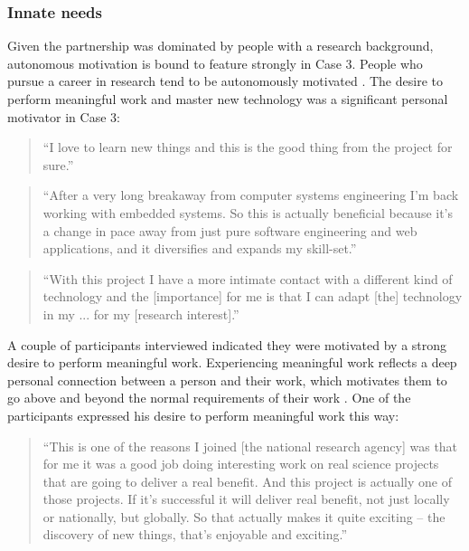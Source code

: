 \subsubsection{Innate needs}

Given the partnership was dominated by people with a research background, autonomous motivation is bound to feature strongly in Case 3. People who pursue a career in research tend to be autonomously motivated \citep{ryan2014work,suominen2021gold}. The desire to perform meaningful work and master new technology was a significant personal motivator in Case 3:

\begin{quote}
\small
\enquote{I love to learn new things and this is the good thing from the project for sure.} \\
\end{quote}

\begin{quote}
\small
\enquote{After a very long breakaway from computer systems engineering I'm back working with embedded systems. So this is actually beneficial because it's a change in pace away from just pure software engineering and web applications, and it diversifies and expands my skill-set.} \\
\end{quote}

\begin{quote}
\small
\enquote{With this project I have a more intimate contact with a different kind of technology and the [importance] for me is that I can adapt [the] technology in my ... for my [research interest].} \\
\end{quote}

A couple of participants interviewed indicated they were motivated by a strong desire to perform meaningful work. Experiencing meaningful work reflects a deep personal connection between a person and their work, which motivates them to go above and beyond the normal requirements of their work \citep{van2018motivational}. One of the participants expressed his desire to perform meaningful work this way:

\begin{quote}
\small
\enquote{This is one of the reasons I joined [the national research agency] was that for me it was a good job doing interesting work on real science projects that are going to deliver a real benefit. And this project is actually one of those projects. If it's successful it will deliver real benefit, not just locally or nationally, but globally. So that actually makes it quite exciting -- the discovery of new things, that's enjoyable and exciting.} \\
\end{quote}
 
